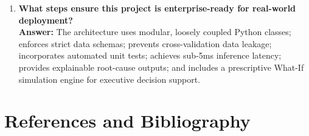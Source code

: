 \documentclass[11pt, a4paper]{article}
\begin{document}
\begin{enumerate}
    \item \textbf{What steps ensure this project is enterprise-ready for real-world deployment?}\\
    \textbf{Answer:} The architecture uses modular, loosely coupled Python classes; enforces strict data schemas; prevents cross-validation data leakage; incorporates automated unit tests; achieves sub-5ms inference latency; provides explainable root-cause outputs; and includes a prescriptive What-If simulation engine for executive decision support.
\end{enumerate}

\clearpage

\section{References and Bibliography}
\end{document}
